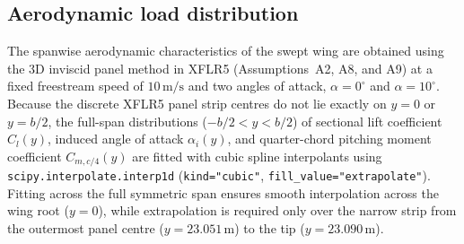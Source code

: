 \subsection{Aerodynamic load distribution}
\label{subsec:aero_loads}

The spanwise aerodynamic characteristics of the swept wing are obtained using the 3D inviscid panel method in XFLR5 (Assumptions~A2, A8, and A9) at a fixed freestream speed of $10\,\text{m/s}$ and two angles of attack, $\alpha = 0^\circ$ and $\alpha = 10^\circ$. Because the discrete XFLR5 panel strip centres do not lie exactly on $y = 0$ or $y = b/2$, the full-span distributions ($-b/2 < y < b/2$) of sectional lift coefficient $C_l(y)$, induced angle of attack $\alpha_i(y)$, and quarter-chord pitching moment coefficient $C_{m,c/4}(y)$ are fitted with cubic spline interpolants using \texttt{scipy.interpolate.interp1d} (\texttt{kind="cubic"}, \texttt{fill\_value="extrapolate"}). Fitting across the full symmetric span ensures smooth interpolation across the wing root ($y = 0$), while extrapolation is required only over the narrow strip from the outermost panel centre ($y = 23.051\,\text{m}$) to the tip ($y = 23.090\,\text{m}$).

